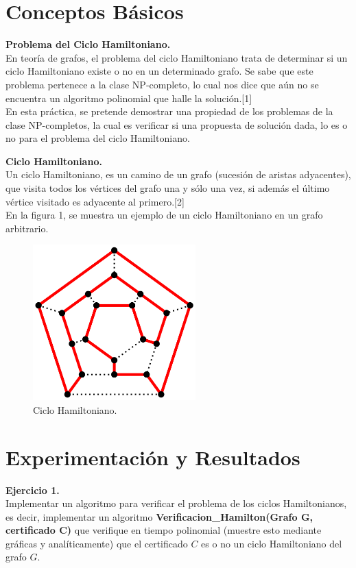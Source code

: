 \documentclass[12pt]{report}
\begin{document}
	\newpage

	\section{Conceptos Básicos}
	\textbf{Problema del Ciclo Hamiltoniano.}\\
	
	En teoría de grafos, el problema del ciclo Hamiltoniano trata de determinar si un ciclo Hamiltoniano existe o no en un determinado grafo. Se sabe que este problema pertenece a la clase NP-completo, lo cual nos dice que aún no se encuentra un algoritmo polinomial que halle la solución.[1]\\
	En esta práctica, se pretende demostrar una propiedad de los problemas de la clase NP-completos, la cual es verificar si una propuesta de solución dada, lo es o no para el problema del ciclo Hamiltoniano.
	\newline
	
	\textbf{Ciclo Hamiltoniano.}\\
	
	Un ciclo Hamiltoniano, es un camino de un grafo (sucesión de aristas adyacentes), que visita todos los vértices del grafo una y sólo una vez, si además el último vértice visitado es adyacente al primero.[2]\\
	En la figura 1, se muestra un ejemplo de un ciclo Hamiltoniano en un grafo arbitrario.
		
		\begin{figure}[H]
			\includegraphics[height=6cm]{imagenes/1.png}
			\centering
			\caption{Ciclo Hamiltoniano.}
			\centering
		\end{figure}
	
	
		

	\section{Experimentación y Resultados}	
	\textbf{Ejercicio 1.}\\
Implementar un algoritmo para verificar el problema de los ciclos Hamiltonianos, es
decir, implementar un algoritmo \textbf{Verificacion\_Hamilton(Grafo G, certificado C)} que verifique en tiempo polinomial (muestre esto mediante gráficas y analíticamente) que el certificado $C$ es o no un ciclo Hamiltoniano del grafo $G$.\\
\end{document}

